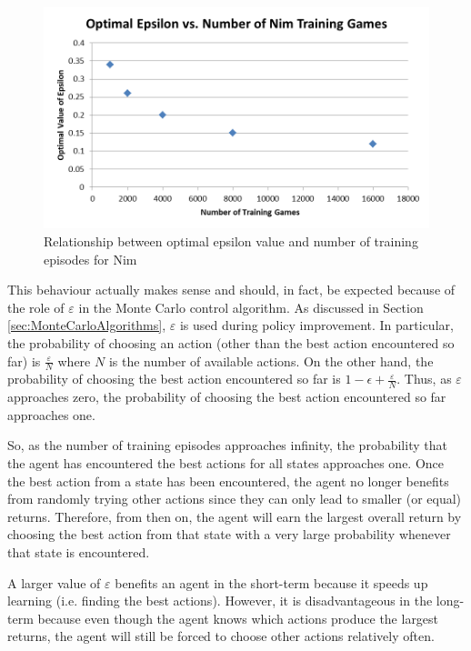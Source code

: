 \documentclass[11pt,a4paper]{report}
\begin{document}
\begin{figure}[htbp]
	\begin{center}
		\includegraphics[width=125mm]{Nim_OptimalEpsilon_vs_Training.png}
		\caption{Relationship between optimal epsilon value and number of training episodes for Nim}
		\label{nim-training-vs-opt-epsilon}
	\end{center}
\end{figure}

This behaviour actually makes sense and should, in fact, be expected because of the role of $\varepsilon$ in the Monte Carlo control algorithm. As discussed in Section \ref{sec:MonteCarloAlgorithms}, $\varepsilon$ is used during policy improvement. In particular, the probability of choosing an action (other than the best action encountered so far) is $\frac{\varepsilon}{N}$ where $N$ is the number of available actions. On the other hand, the probability of choosing the best action encountered so far is  $1 - \epsilon + \frac{\varepsilon}{N}$. Thus, as $\varepsilon$ approaches zero, the probability of choosing the best action encountered so far approaches one.

So, as the number of training episodes approaches infinity, the probability that the agent has encountered the best actions for all states approaches one. Once the best action from a state has been encountered, the agent no longer benefits from randomly trying other actions since they can only lead to smaller (or equal) returns. Therefore, from then on, the agent will earn the largest overall return by choosing the best action from that state with a very large probability whenever that state is encountered.

A larger value of $\varepsilon$ benefits an agent in the short-term because it speeds up learning (i.e. finding the best actions). However, it is disadvantageous in the long-term because even though the agent knows which actions produce the largest returns, the agent will still be forced to choose other actions relatively often.
\end{document}
